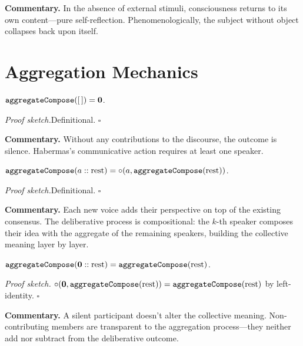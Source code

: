 \medskip

\noindent\textbf{Commentary.}
In the absence of external stimuli, consciousness returns to its own
content---pure self-reflection.  Phenomenologically, the subject without
object collapses back upon itself.

\section{Aggregation Mechanics}
\label{sec:ch19-aggregate}

\begin{theorem}
\label{thm:aggregate_nil}
$\texttt{aggregateCompose}([\,]) = \mathbf{0}$.
\end{theorem}

\noindent\textit{Proof sketch.}\quad Definitional. \hfill$\square$

\medskip

\noindent\textbf{Commentary.}
Without any contributions to the discourse, the outcome is silence.
Habermas's communicative action requires at least one speaker.

\begin{theorem}
\label{thm:aggregate_cons}
$\texttt{aggregateCompose}(a :: \text{rest}) = \circ(a, \texttt{aggregateCompose}(\text{rest}))$.
\end{theorem}

\noindent\textit{Proof sketch.}\quad Definitional. \hfill$\square$

\medskip

\noindent\textbf{Commentary.}
Each new voice adds their perspective on top of the existing consensus.
The deliberative process is compositional: the $k$-th speaker composes
their idea with the aggregate of the remaining speakers, building the
collective meaning layer by layer.

\begin{theorem}
\label{thm:void_aggregate}
$\texttt{aggregateCompose}(\mathbf{0} :: \text{rest}) = \texttt{aggregateCompose}(\text{rest})$.
\end{theorem}

\noindent\textit{Proof sketch.}\quad
$\circ(\mathbf{0}, \texttt{aggregateCompose}(\text{rest})) =
\texttt{aggregateCompose}(\text{rest})$ by left-identity.
\hfill$\square$

\medskip

\noindent\textbf{Commentary.}
A silent participant doesn't alter the collective meaning.  Non-contributing
members are transparent to the aggregation process---they neither add nor
subtract from the deliberative outcome.

